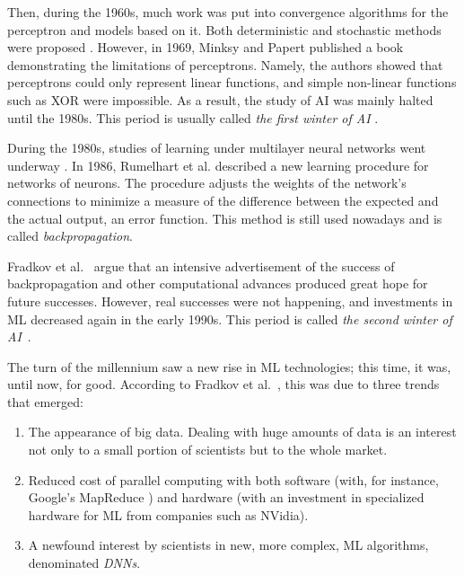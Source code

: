 Then, during the 1960s, much work was put into convergence algorithms for the perceptron and models based on it. Both deterministic and stochastic methods were proposed \cite{fradkov_early_2020}. However, in 1969, Minksy and Papert \cite{marvin_minsky_perceptrons_1969} published a book demonstrating the limitations of perceptrons. Namely, the authors showed that perceptrons could only represent linear functions, and simple non-linear functions such as \ac{XOR} were impossible. As a result, the study of \ac{AI} was mainly halted until the 1980s. This period is usually called \textit{the first winter of \ac{AI}} \cite{fradkov_early_2020}.

During the 1980s, studies of learning under multilayer neural networks went underway \cite{fradkov_early_2020}. In 1986, Rumelhart et al. \cite{rumelhart_learning_1986} described a new learning procedure for networks of neurons. The procedure adjusts the weights of the network's connections to minimize a measure of the difference between the expected and the actual output, an error function. This method is still used nowadays and is called \textit{backpropagation}.

Fradkov et al.~\cite{fradkov_early_2020} argue that an intensive advertisement of the success of backpropagation and other computational advances produced great hope for future successes. However, real successes were not happening, and investments in \ac{ML} decreased again in the early 1990s. This period is called \textit{the second winter of \ac{AI}}~\cite{martinez_artificial_2019}.

The turn of the millennium saw a new rise in \ac{ML} technologies; this time, it was, until now, for good. According to Fradkov et al.~\cite{fradkov_early_2020}, this was due to three trends that emerged:

\begin{enumerate}
	\item The appearance of big data. Dealing with huge amounts of data is an interest not only to a small portion of scientists but to the whole market.
	\item Reduced cost of parallel computing with both software (with, for instance, Google's MapReduce \cite{dean_mapreduce_2004}) and hardware (with an investment in specialized hardware for \ac{ML} from companies such as NVidia).
	\item A newfound interest by scientists in new, more complex, \ac{ML} algorithms, denominated \textit{\acfp{DNN}}.
\end{enumerate}

